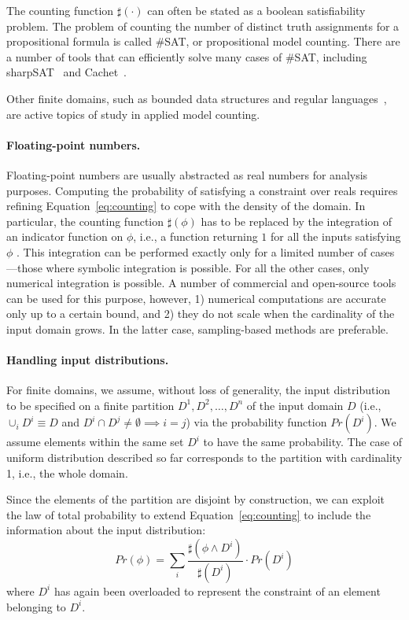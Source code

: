 The counting function $\sharp(\cdot)$ can often be stated as a boolean
satisfiability problem.
The problem of counting the number of distinct truth assignments for
a propositional formula is called \#SAT, or propositional model counting.
There are a number of tools that can efficiently solve many cases of
\#SAT, including sharpSAT~\cite{thurley2006sharpsat} and Cachet~\cite{sang2005heuristics}.

Other finite domains, such as bounded data structures \cite{Filieri2015} and regular languages~\cite{Luu2014,Aydin2015}, are active topics of study in applied model counting.


\paragraph{Floating-point numbers.} 
Floating-point numbers are usually abstracted as real numbers for analysis purposes. Computing the probability of satisfying a constraint over reals requires refining Equation~\ref{eq:counting} to cope with the density of the domain. In particular, the counting function $\sharp(\phi)$ has to be replaced by the integration of an indicator function on $\phi$, i.e., a function returning $1$ for all the inputs satisfying $\phi$ \cite{Borges2014}. This integration can be performed exactly only for a limited number of cases---those where symbolic integration is possible. For all the other cases, only numerical integration is possible. A number of commercial and open-source tools can be used for this purpose, however, 1) numerical computations are accurate only up to a certain bound, and 2) they do not scale when the cardinality of the input domain grows. In the latter case, sampling-based methods are preferable. 

\paragraph{Handling input distributions.} 
For finite domains, we assume, without loss of generality, the input distribution to be specified on a finite partition $D^1, D^2, \dots, D^n$ of the input domain $D$ (i.e., $\cup_i D^i \equiv D$ and $D^i \cap D^j \neq \emptyset \implies i=j$) via the probability function $Pr(D^i)$. We assume elements within the same set $D^i$ to have the same probability. The case of uniform distribution described so far corresponds to the partition with cardinality 1, i.e., the whole domain.
 
Since the elements of the partition are disjoint by construction, we can exploit the law of total probability to extend Equation~\eqref{eq:counting} to include the information about the input distribution:
%
\begin{equation}\label{eq:countingInputDistribution}
	Pr(\phi) = \sum_i \frac{\sharp(\phi \land D^i)}{\sharp(D^i)} \cdot Pr(D^i)
\end{equation}
%
\noindent where $D^i$ has again been overloaded to represent the constraint of an element belonging to $D^i$.

